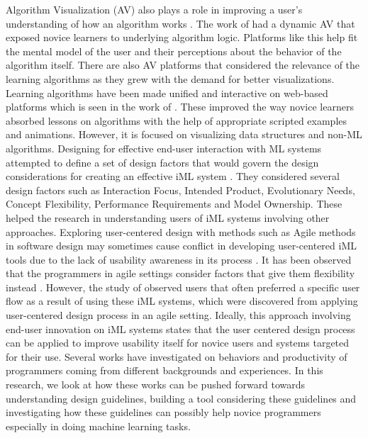 \documentclass{sigchi-ext}
\begin{document}
Algorithm Visualization (AV) also plays a role in improving a user's understanding of how an algorithm works \cite{shaffer2010algorithm}. The work of \cite{vrachnos2008dave} had a dynamic AV that exposed novice learners to underlying algorithm logic. Platforms like this help fit the mental model of the user and their perceptions about the behavior of the algorithm itself. There are also AV platforms that considered the relevance of the learning algorithms as they grew with the demand for better visualizations. Learning algorithms have been made unified and interactive on web-based platforms which is seen in the work of \cite{halim2012learning}. These improved the way novice learners absorbed lessons on algorithms with the help of appropriate scripted examples and animations. However, it is focused on visualizing data structures and non-ML algorithms. Designing for effective end-user interaction with ML systems attempted to define a set of design factors that would govern the design considerations for creating an effective iML system \cite{amershi2011designing}. They considered several design factors such as Interaction Focus, Intended Product, Evolutionary Needs, Concept Flexibility, Performance Requirements and Model Ownership. These helped the research in understanding users of iML systems involving other approaches. Exploring user-centered design with methods such as Agile methods in software design may sometimes cause conflict in developing user-centered iML tools due to the lack of usability awareness in its process \cite{da2011user}. It has been observed that the programmers in agile settings consider factors that give them flexibility instead \cite{hussain2009current}. However, the study of \cite{sarkar2015interactive} observed users that often preferred a specific user flow as a result of using these iML systems, which were discovered from applying user-centered design process in an agile setting. Ideally, this approach involving end-user innovation on iML systems states that the user centered design process can be applied to improve usability itself for novice users \cite{bernardo2016interactive} and systems targeted for their use. Several works have investigated on behaviors and productivity of programmers coming from different backgrounds and experiences. In this research, we look at how these works can be pushed forward towards understanding design guidelines, building a tool considering these guidelines and investigating how these guidelines can possibly help novice programmers especially in doing machine learning tasks. 
\end{document}
